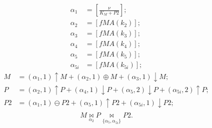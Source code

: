 		\begin{align*}
			\alpha_1 &= \left[\frac{\nu}{K_M + P2}\right];\\
			\alpha_2 &= [fMA(k_2)];\\
			\alpha_3 &= [fMA(k_3)];\\
			\alpha_4 &= [fMA(k_4)];\\
			\alpha_5 &= [fMA(k_5)];\\
			\alpha_{5i} &= [fMA(k_{5i})];
		\end{align*}
		\begin{align*}
			M &= (\alpha_1, 1) \uparrow M + (\alpha_2, 1) \oplus M + (\alpha_3, 1) \downarrow M;\\
			P &= (\alpha_2, 1) \uparrow P + (\alpha_4, 1) \downarrow P + (\alpha_5, 2) \downarrow P + (\alpha_{5i}, 2) \uparrow P;\\
			P2 &= (\alpha_1, 1) \ominus P2 + (\alpha_5, 1) \uparrow P2 + (\alpha_{5i}, 1) \downarrow P2;\\
		\end{align*}
		\begin{equation}\label{eq:biopepa}
			M \underset{\alpha_2}{\bowtie} P \underset{\{\alpha_5, \alpha_{5i}\}}{\bowtie} P2.
		\end{equation}
		
